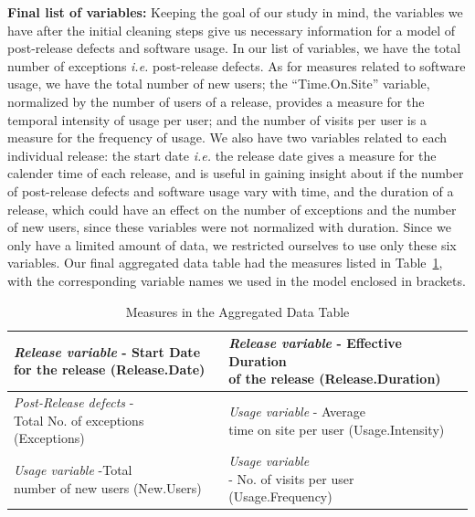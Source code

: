\documentclass[smallextended]{svjour3}       %
\begin{document}
\noindent
\textbf{Final list of variables:}
Keeping the goal of our study in mind, the variables we have after the initial cleaning 
steps give us necessary information for a model of post-release defects and software usage.
In our list of variables, we have the total number of exceptions \textit{i.e.} post-release defects. 
As for measures related to software usage, we have the total number of new users;
the ``Time.On.Site'' variable, normalized by the number of users of a release,
provides a measure for the temporal intensity of usage per user;
and the number of visits per user is a measure for the frequency of usage.
We also have two variables related to each individual release: the start date \textit{i.e.} the release
date gives a measure for the calender time of each release, and is useful in gaining insight
about if the number of post-release defects and software usage vary with time, and 
the duration of a release, which could have an effect on the number of exceptions
and the number of new users, since these variables were not normalized with duration.
Since we only have a limited amount of data, we restricted ourselves to use only 
these six variables.
Our final aggregated data table had the measures listed in Table~\ref{t:finalvarss}, 
with the corresponding variable names we used in the model enclosed in brackets. 

\begin{table}
\caption{Measures in the Aggregated Data Table}\label{t:finalvarss}
\begin{tabular}{|l|l|}\hline
\pbox{6cm}{\textit{Release variable} - Start Date \\for the release (Release.Date)} & \pbox{6cm}{\textit{Release variable} - Effective Duration \\of the release (Release.Duration)}\\\hline
\pbox{6cm}{\textit{Post-Release defects} - \\Total No. of exceptions (Exceptions)}  &  \pbox{6cm}{\textit{Usage variable} - Average\\ time on site per user (Usage.Intensity)}\\\hline
\pbox{6cm}{\textit{Usage variable} -Total\\ number of new users (New.Users)} & \pbox{6cm}{\textit{Usage variable} \\- No. of visits per user (Usage.Frequency)}\\\hline
\end{tabular}
\vspace{-15pt}
\end{table}
\end{document}
